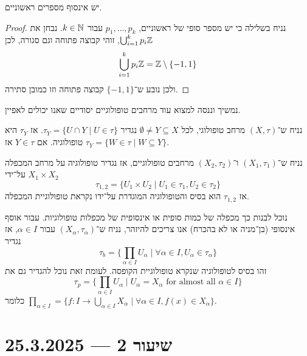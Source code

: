 \begin{corollary}
	יש אינסוף מספרים ראשוניים.
\end{corollary}
\begin{proof}
	נניח בשלילה כי יש מספר סופי של ראשוניים, $p_1, \dots, p_k$ עבור $k \in \mathbb{N}$.
	נבחן את $\bigcup_{i = 1}^k p_i \mathbb{Z}$, זוהי קבוצה פתוחה וגם סגורה, לכן
	\[
		\bigcup_{i = 1}^k p_i \mathbb{Z}
		= \mathbb{Z} \setminus \{ -1, 1 \}
	\]
	ולכן נובע ש־$\{-1, 1\}$ קבוצה פתוחה וזו כמובן סתירה.
\end{proof}
נמשיך וננסה למצוא עוד מרחבים טופולוגיים יסודיים שאנו יכולים לאפיין.
\begin{proposition}
	נניח ש־$(X, \tau)$ מרחב טופולוגי, לכל $\emptyset \ne Y \subseteq X$ נגדיר $\tau_Y = \{ U \cap Y \mid U \in \tau \}$.
	אז $\tau_Y$ היא טופולוגיה.
	אם $Y \in \tau$ אז $\tau_Y = \{ W \in \tau \mid W \subseteq Y \}$.
\end{proposition}
\begin{proposition}
	נניח ש־$(X_1, \tau_1)$ ו־$(X_2, \tau_2)$ מרחבים טופולוגיים, אז נגדיר טופולוגיה על מרחב המכפלה $X_1 \times X_2$ על־ידי
	\[
		\tau_{1, 2}
		= \{ U_1 \times U_2 \mid U_1 \in \tau_1, U_2 \in \tau_2 \}
	\]
	אז $\tau_{1, 2}$ הוא בסיס והטופולוגיה המוגדרת על־ידו נקראת טופולוגיית המכפלה.
\end{proposition}
\begin{example}
	נוכל לבנות כך מכפלה של כמות סופית או אינסופית של מכפלות טופולוגיות.
	עבור אוסף אינסופי (בן־מניה או לא בהכרח) אנו צריכים להיזהר, נניח ש־$(X_\alpha, \tau_\alpha)$ עבור $\alpha \in I$, אז נגדיר
	\[
		\tau_b = \{ \prod_{\alpha \in I} U_\alpha \mid \forall \alpha \in I, U_\alpha \in \tau_\alpha \}
	\]
	זהו בסיס לטופולוגיה שנקרא טופולוגיית הקופסה.
	לעומת זאת נוכל להגדיר גם את
	\[
		\tau_p
		= \{ \prod_{\alpha \in I} U_\alpha \mid U_\alpha = X_\alpha \text{ for almost all } \alpha \in I \}
	\]
	כלומר $\prod_{\alpha \in I} = \{ f : I \to \bigcup_{\alpha \in I} X_\alpha \mid \forall \alpha \in I, f(x) \in X_\alpha \}$.
\end{example}

\section{שיעור 2 --- 25.3.2025}
